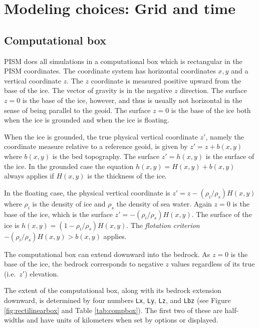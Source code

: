 
\section{Modeling choices: Grid and time}
\label{sec:modeling-computational}

\subsection{Computational box} \label{subsect:coords}

PISM does all simulations in a computational box which is rectangular in the PISM coordinates.  The coordinate system has horizontal coordinates $x,y$ and a vertical coordinate $z$.  The $z$ coordinate is measured positive upward from the base of the ice.  The vector of gravity is in the negative $z$ direction.  The surface $z=0$ is the base of the ice, however, and thus is usually not horizontal in the sense of being parallel to the geoid.   The surface $z=0$ is the base of the ice both when the ice is grounded and when the ice is floating.

When the ice is grounded, the true physical vertical coordinate $z'$, namely the coordinate measure relative to a reference geoid, is given by $z'=z+b(x,y)$ where $b(x,y)$ is the bed topography.  The surface $z'=h(x,y)$ is the surface of the ice.  In the grounded case the equation $h(x,y)=H(x,y)+b(x,y)$ always applies if $H(x,y)$ is the thickness of the ice.

In the floating case, the physical vertical coordinate is $z'=z-(\rho_i/\rho_s) H(x,y)$ where $\rho_i$ is the density of ice and $\rho_s$ the density of sea water.  Again $z=0$ is the base of the ice, which is the surface $z' = -(\rho_i/\rho_s) H(x,y)$.  The surface of the ice is $h(x,y) = (1-\rho_i/\rho_s) H(x,y)$.  The \emph{flotation criterion} $-(\rho_i/\rho_s) H(x,y) > b(x,y)$ applies.

The computational box can extend downward into the bedrock.  As $z=0$ is the base of the ice, the bedrock corresponds to negative $z$ values regardless of its true (i.e.~$z'$) elevation.

The extent of the computational box, along with its bedrock extension downward, is determined by four numbers \texttt{Lx}, \texttt{Ly}, \texttt{Lz}, and \texttt{Lbz} (see Figure \ref{fig:rectilinearbox} and Table \ref{tab:compbox}).  The first two of these are half-widths and have units of kilometers when set by options or displayed.

